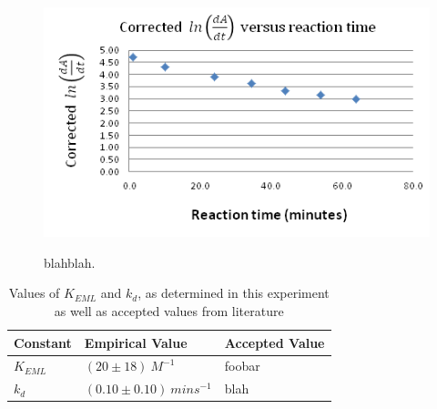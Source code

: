 \begin{figure}[h]
  \includegraphics[scale=0.5]{./Figures/016M_dipic_readings.png}\\
  \caption{blahblah.}\label{fig:0.016M_dipic_readings}
\end{figure}

\begin{center}
\begin{table}[h]
    \begin{tabular}{| l | l | l |}
    \hline
    Constant & Empirical Value & Accepted Value \\ \hline
    $K_{EML}$ & $(20\pm{18}){\ }M^{-1}$ & foobar \\ \hline
    $k_{d}$ & $(0.10\pm{0.10}){\ }mins^{-1}$ & blah \\ 
    \hline
    \end{tabular}
    \caption[Table caption text]{Values of $K_{EML}$ and $k_d$, as determined in this experiment as well as accepted values from literature}
    \label{tbl:summary}
\end{table}
\end{center}